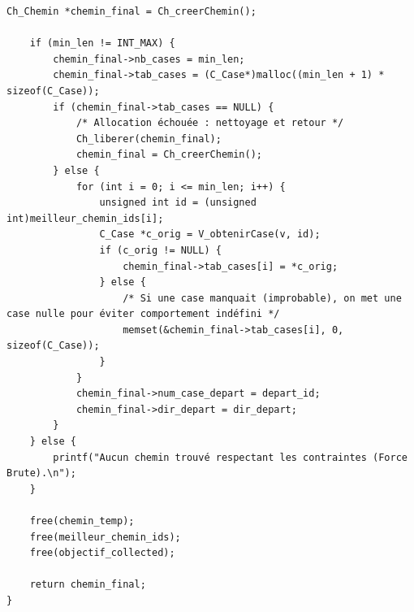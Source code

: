 \begin{lstlisting}[caption={Ch\_genererCheminBrute}]
    Ch_Chemin *chemin_final = Ch_creerChemin();

    if (min_len != INT_MAX) {
        chemin_final->nb_cases = min_len;
        chemin_final->tab_cases = (C_Case*)malloc((min_len + 1) * sizeof(C_Case));
        if (chemin_final->tab_cases == NULL) {
            /* Allocation échouée : nettoyage et retour */
            Ch_liberer(chemin_final);
            chemin_final = Ch_creerChemin();
        } else {
            for (int i = 0; i <= min_len; i++) {
                unsigned int id = (unsigned int)meilleur_chemin_ids[i];
                C_Case *c_orig = V_obtenirCase(v, id);
                if (c_orig != NULL) {
                    chemin_final->tab_cases[i] = *c_orig;
                } else {
                    /* Si une case manquait (improbable), on met une case nulle pour éviter comportement indéfini */
                    memset(&chemin_final->tab_cases[i], 0, sizeof(C_Case));
                }
            }
            chemin_final->num_case_depart = depart_id;
            chemin_final->dir_depart = dir_depart;
        }
    } else {
        printf("Aucun chemin trouvé respectant les contraintes (Force Brute).\n");
    }

    free(chemin_temp);
    free(meilleur_chemin_ids);
    free(objectif_collected);

    return chemin_final;
}
\end{lstlisting}